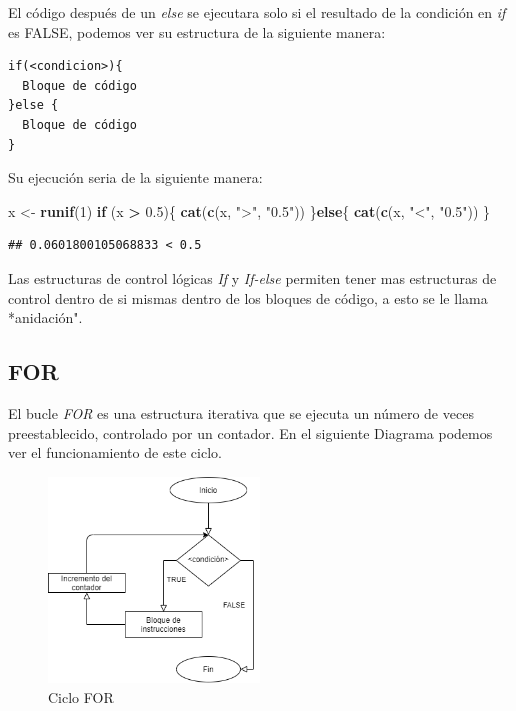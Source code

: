 \documentclass[11pt,]{article}
\newenvironment{Shaded}{\begin{snugshade}}{\end{snugshade}}
\newcommand{\ControlFlowTok}[1]{\textcolor[rgb]{0.13,0.29,0.53}{\textbf{#1}}}
\newcommand{\DecValTok}[1]{\textcolor[rgb]{0.00,0.00,0.81}{#1}}
\newcommand{\FloatTok}[1]{\textcolor[rgb]{0.00,0.00,0.81}{#1}}
\newcommand{\KeywordTok}[1]{\textcolor[rgb]{0.13,0.29,0.53}{\textbf{#1}}}
\newcommand{\NormalTok}[1]{#1}
\newcommand{\OperatorTok}[1]{\textcolor[rgb]{0.81,0.36,0.00}{\textbf{#1}}}
\newcommand{\StringTok}[1]{\textcolor[rgb]{0.31,0.60,0.02}{#1}}
\begin{document}
El código después de un \emph{else} se ejecutara solo si el resultado de
la condición en \emph{if} es FALSE, podemos ver su estructura de la
siguiente manera:

\begin{verbatim}
if(<condicion>){
  Bloque de código
}else {
  Bloque de código
}
\end{verbatim}

Su ejecución seria de la siguiente manera:

\begin{Shaded}
\begin{Highlighting}[]
\NormalTok{x <-}\StringTok{ }\KeywordTok{runif}\NormalTok{(}\DecValTok{1}\NormalTok{)}
\ControlFlowTok{if}\NormalTok{ (x }\OperatorTok{>}\StringTok{ }\FloatTok{0.5}\NormalTok{)\{}
  \KeywordTok{cat}\NormalTok{(}\KeywordTok{c}\NormalTok{(x, }\StringTok{">"}\NormalTok{, }\StringTok{"0.5"}\NormalTok{))}
\NormalTok{\}}\ControlFlowTok{else}\NormalTok{\{}
  \KeywordTok{cat}\NormalTok{(}\KeywordTok{c}\NormalTok{(x, }\StringTok{"<"}\NormalTok{, }\StringTok{"0.5"}\NormalTok{))}
\NormalTok{\}}
\end{Highlighting}
\end{Shaded}

\begin{verbatim}
## 0.0601800105068833 < 0.5
\end{verbatim}

Las estructuras de control lógicas \emph{If} y \emph{If-else} permiten
tener mas estructuras de control dentro de si mismas dentro de los
bloques de código, a esto se le llama *anidación".

\hypertarget{for}{%
\subsection{FOR}\label{for}}

El bucle \emph{FOR} es una estructura iterativa que se ejecuta un número
de veces preestablecido, controlado por un contador. En el siguiente
Diagrama podemos ver el funcionamiento de este ciclo.

\begin{figure}
\hypertarget{id}{%
\centering
\includegraphics[width=0.5\textwidth,height=0.3\textheight]{../schemas/FOR.png}
\caption{Ciclo FOR}\label{id}
}
\end{figure}
\end{document}
